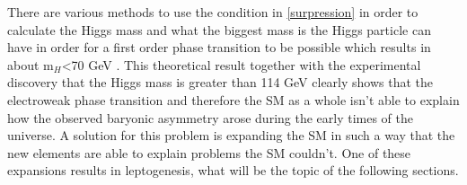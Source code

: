 There are various methods to use the condition in \ref{surpression} in order to calculate the Higgs mass and what the biggest mass is the Higgs particle can have in order for a first order phase transition to be possible which results in about m$_H$<70 GeV \cite[pp. 3f.]{Fodor:1999at}. \newline
This theoretical result together with the experimental discovery that the Higgs mass is greater than 114 GeV \cite[pp. 100ff.]{Abbaneo:2001ix} clearly shows that the electroweak phase transition and therefore the SM as a whole isn't able to explain how the observed baryonic asymmetry arose during the early times of the universe. \newline
A solution for this problem is expanding the SM in such a way that the new elements are able to explain problems the SM couldn't. One of these expansions results in leptogenesis, what will be the topic of the following sections.